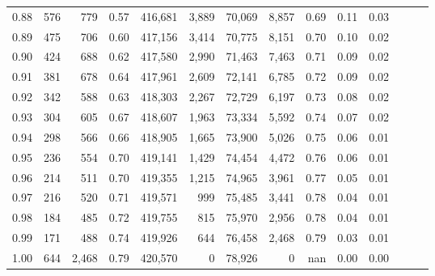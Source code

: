 \begin{tabular}{rrrrrrrrrrrrrr}
0.88 &     576 &    779 &  0.57 &  416,681 &    3,889 &  70,069 &   8,857 &  0.69 &  0.11 &      0.03 \\
0.89 &     475 &    706 &  0.60 &  417,156 &    3,414 &  70,775 &   8,151 &  0.70 &  0.10 &      0.02 \\
0.90 &     424 &    688 &  0.62 &  417,580 &    2,990 &  71,463 &   7,463 &  0.71 &  0.09 &      0.02 \\
0.91 &     381 &    678 &  0.64 &  417,961 &    2,609 &  72,141 &   6,785 &  0.72 &  0.09 &      0.02 \\
0.92 &     342 &    588 &  0.63 &  418,303 &    2,267 &  72,729 &   6,197 &  0.73 &  0.08 &      0.02 \\
0.93 &     304 &    605 &  0.67 &  418,607 &    1,963 &  73,334 &   5,592 &  0.74 &  0.07 &      0.02 \\
0.94 &     298 &    566 &  0.66 &  418,905 &    1,665 &  73,900 &   5,026 &  0.75 &  0.06 &      0.01 \\
0.95 &     236 &    554 &  0.70 &  419,141 &    1,429 &  74,454 &   4,472 &  0.76 &  0.06 &      0.01 \\
0.96 &     214 &    511 &  0.70 &  419,355 &    1,215 &  74,965 &   3,961 &  0.77 &  0.05 &      0.01 \\
0.97 &     216 &    520 &  0.71 &  419,571 &      999 &  75,485 &   3,441 &  0.78 &  0.04 &      0.01 \\
0.98 &     184 &    485 &  0.72 &  419,755 &      815 &  75,970 &   2,956 &  0.78 &  0.04 &      0.01 \\
0.99 &     171 &    488 &  0.74 &  419,926 &      644 &  76,458 &   2,468 &  0.79 &  0.03 &      0.01 \\
1.00 &     644 &  2,468 &  0.79 &  420,570 &        0 &  78,926 &       0 &   nan &  0.00 &      0.00 \\
\bottomrule
\end{tabular}
